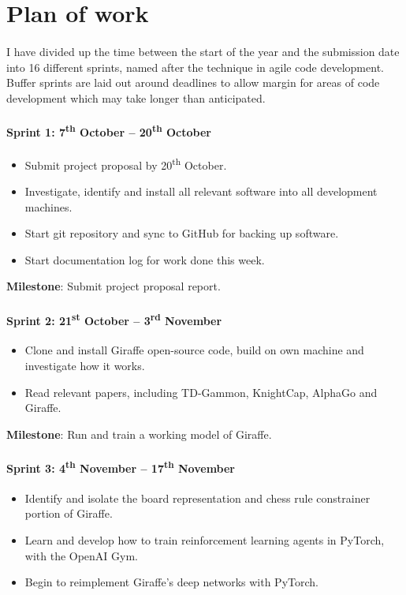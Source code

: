 \documentclass[a4paper]{article}
\begin{document}
\section*{Plan of work}

\paragraph{} I have divided up the time between the start of the year and the submission date into 16 different sprints, named after the technique in agile code development. Buffer sprints are laid out around deadlines to allow margin for areas of code development which may take longer than anticipated.

\paragraph{Sprint 1: 7\textsuperscript{th} October -- 20\textsuperscript{th} October}
\begin{itemize}
\item Submit project proposal by 20\textsuperscript{th} October.
\item Investigate, identify and install all relevant software into all development machines.
\item Start git repository and sync to GitHub for backing up software.
\item Start documentation log for work done this week.
\end{itemize}

\textbf{Milestone}: Submit project proposal report.

\paragraph{Sprint 2: 21\textsuperscript{st} October -- 3\textsuperscript{rd} November}
\begin{itemize}
\item Clone and install Giraffe open-source code, build on own machine and investigate how it works.
\item Read relevant papers, including TD-Gammon, KnightCap, AlphaGo and Giraffe. 
\end{itemize}

\textbf{Milestone}: Run and train a working model of Giraffe.

\paragraph{Sprint 3: 4\textsuperscript{th} November -- 17\textsuperscript{th} November}
\begin{itemize}
\item Identify and isolate the board representation and chess rule constrainer portion of Giraffe.
\item Learn and develop how to train reinforcement learning agents in PyTorch, with the OpenAI Gym.
\item Begin to reimplement Giraffe's deep networks with PyTorch.
\end{itemize}
\end{document}
